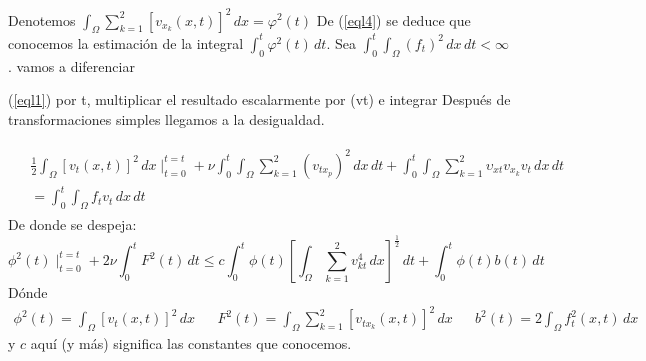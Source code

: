 Denotemos $\int_{\Omega}\sum_{k=1}^2\left[v_{x_k}(x,t)\right]^2\,dx=\varphi^2(t)$ De (\ref{eql4}) se deduce que conocemos la estimación de la integral $\int_0^t \varphi^2(t)\,dt $. Sea $\int_0^t\int_{\Omega} \left(f_t\right)^2\,dx\,dt<\infty$. vamos a diferenciar

(\ref{eql1}) por t, multiplicar el resultado escalarmente por (vt) e integrar
Después de transformaciones simples llegamos a la desigualdad.

\begin{align}
    \begin{split}
        &\frac{1}{2} \int_{\Omega}\left[v_t(x,t)\right]^2\,dx\mid_{t = 0}^{t = t} + \nu\int_0^t\int_{\Omega}\sum_{k = 1}^2\left(v_{tx_p}\right)^2\,dx\,dt + \int_0^t\int_{\Omega}\sum_{k = 1}^2 \upsilon_{xt} v_{x_k}v_t\,dx\,dt\\
        &= \int_0^t\int_{\Omega}f_tv_t\,dx\,dt
        \label{e}
    \end{split}
\end{align}
De donde se despeja:
\begin{equation}
    \phi^2(t)\mid_{t = 0}^{t = t} + 2\nu\int_0^t F^2(t)\,dt\leq c\int_0^t\phi(t)\left[\int_{\Omega}\sum_{k = 1}^2v^4_{kt}\,dx \right]^{\frac{1}{2}}\,dt +\int_0^t\phi(t)b(t)\,dt
    \label{eql6}
\end{equation}
Dónde
\begin{align*}
    \phi^2(t) = \int_{\Omega}\left[v_t(x,t)\right]^2\,dx&&F^2(t) = \int_{\Omega}\sum_{k = 1}^2\left[v_{tx_k}(x,t)\right]^2\,dx&& b^2(t) = 2\int_{\Omega} f^2_t(x,t)\,dx
\end{align*}
y $c$ aquí (y más) significa las constantes que conocemos.

